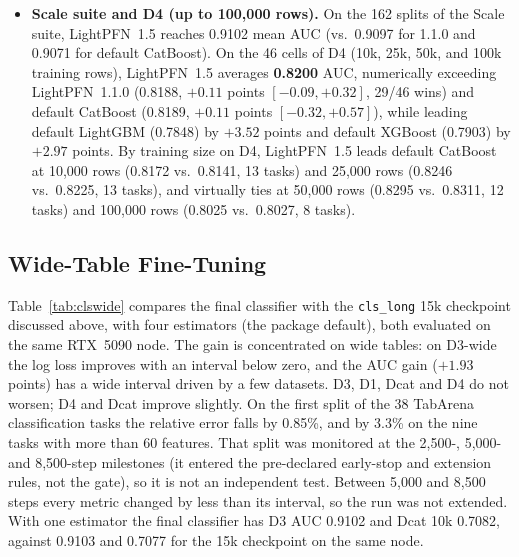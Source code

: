 \documentclass[11pt]{article}
\begin{document}
\begin{itemize}
\item \textbf{Scale suite and D4 (up to 100,000 rows).}
On the 162 splits of the Scale suite, LightPFN~1.5 reaches 0.9102 mean AUC (vs.\ 0.9097 for 1.1.0 and 0.9071 for default CatBoost). %
On the 46 cells of D4 (10k, 25k, 50k, and 100k training rows), LightPFN~1.5 averages \textbf{0.8200} AUC, numerically exceeding LightPFN~1.1.0 (0.8188, $+0.11$ points $[-0.09,+0.32]$, 29/46 wins) and default CatBoost (0.8189, $+0.11$ points $[-0.32, +0.57]$), while leading default LightGBM (0.7848) by $+3.52$ points and default XGBoost (0.7903) by $+2.97$ points. %
By training size on D4, LightPFN~1.5 leads default CatBoost at 10,000 rows (0.8172 vs.\ 0.8141, 13 tasks) and 25,000 rows (0.8246 vs.\ 0.8225, 13 tasks), and virtually ties at 50,000 rows (0.8295 vs.\ 0.8311, 12 tasks) and 100,000 rows (0.8025 vs.\ 0.8027, 8 tasks). %
\end{itemize}

\subsection{Wide-Table Fine-Tuning}
\label{sec:cls-wide}

Table~\ref{tab:clswide} compares the final classifier with the \texttt{cls\_long} 15k checkpoint discussed above, with four estimators (the package default), both evaluated on the same RTX~5090 node. The gain is concentrated on wide tables: on D3-wide the log loss improves with an interval below zero, and the AUC gain ($+1.93$ points) has a wide interval driven by a few datasets. D3, D1, Dcat and D4 do not worsen; D4 and Dcat improve slightly. On the first split of the 38 TabArena classification tasks the relative error falls by 0.85\%, and by 3.3\% on the nine tasks with more than 60 features. That split was monitored at the 2,500-, 5,000- and 8,500-step milestones (it entered the pre-declared early-stop and extension rules, not the gate), so it is not an independent test. Between 5,000 and 8,500 steps every metric changed by less than its interval, so the run was not extended. With one estimator the final classifier has D3 AUC 0.9102 and Dcat 10k 0.7082, against 0.9103 and 0.7077 for the 15k checkpoint on the same node. %
\end{document}
